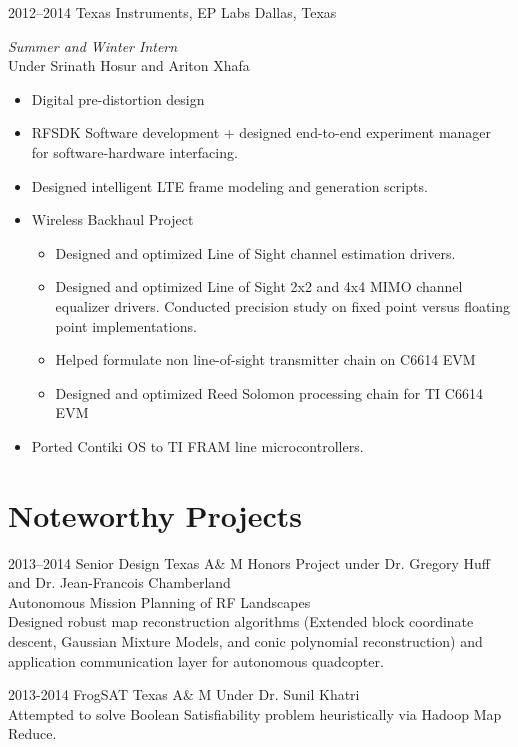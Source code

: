 \documentclass[]{friggeri-cv} %
\begin{document}
\begin{entrylist}

\entry
{2012--2014}
{Texas Instruments, EP Labs}
{Dallas, Texas}
{\emph{Summer and Winter Intern} \\ Under Srinath Hosur and Ariton Xhafa \\ 
\begin{itemize}
\item Digital pre-distortion design 
\item RFSDK Software development + designed end-to-end experiment manager for software-hardware interfacing.
\item Designed intelligent LTE frame modeling and generation scripts.
\item Wireless Backhaul Project
	\begin{itemize}
	\item Designed and optimized Line of Sight channel estimation drivers.
	\item Designed and optimized Line of Sight 2x2 and 4x4 MIMO channel equalizer drivers. Conducted precision study on fixed point versus floating point implementations.
	\item Helped formulate non line-of-sight transmitter chain on C6614 EVM
	\item Designed and optimized Reed Solomon processing chain for TI C6614 EVM 
	\end{itemize}
\item Ported Contiki OS to TI FRAM line microcontrollers. 
\end{itemize}}

\end{entrylist}

\section{Noteworthy Projects}

\begin{entrylist}

\entry
{2013--2014}
{Senior Design}
{Texas A\& M}
{Honors Project under Dr. Gregory Huff and Dr. Jean-Francois Chamberland  \\
Autonomous Mission Planning of RF Landscapes \\
Designed robust map reconstruction algorithms (Extended block coordinate descent, Gaussian Mixture Models, and conic polynomial reconstruction) and application communication layer for autonomous quadcopter.}


\entry
{2013-2014}
{FrogSAT}
{Texas A\& M}
{Under Dr. Sunil Khatri \\
Attempted to solve Boolean Satisfiability problem heuristically via Hadoop Map Reduce.} 


\end{entrylist}
\end{document}
